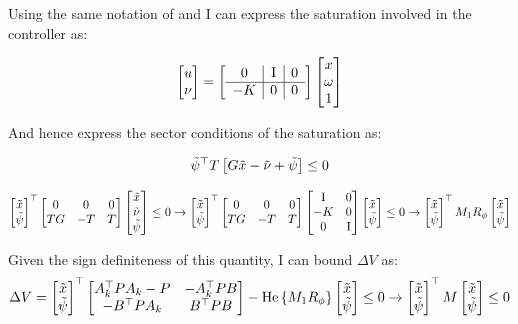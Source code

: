 \documentclass{article}
\begin{document}
Using the same notation of \cite{css-extended} and \cite{css-paper} I can express the saturation involved in the controller as:

\begin{equation}
    \left[\begin{matrix}u\\ \nu\end{matrix}\right] = \left[\begin{matrix}\begin{array}{c|c|c} 
        0 & \operatorname{I} & 0 \\
        \hline
        -K & 0 & 0
    \end{array}\end{matrix}\right]  \left[\begin{matrix}x \\ \omega \\ 1\end{matrix}\right]
\end{equation}

And hence express the sector conditions of the saturation as:

\begin{equation*}
  \tilde{\psi}^\top T \left[ G \tilde{x} - \tilde{\nu} + \tilde{\psi} \right] \leq 0
\end{equation*}

\begin{equation}\label{sector}
  \left[\begin{matrix}\tilde{x} \\ \tilde{\psi}\end{matrix}\right]^\top \left[\begin{matrix}
    0 & 0 & 0 \\
    TG & -T & T
  \end{matrix}\right] \left[\begin{matrix}\tilde{x} \\ \tilde{\nu} \\ \tilde{\psi}\end{matrix}\right] \leq 0 \to
  \left[\begin{matrix}\tilde{x} \\ \tilde{\psi}\end{matrix}\right]^\top \left[\begin{matrix}
    0 & 0 & 0 \\
    TG & -T & T
  \end{matrix}\right] \left[\begin{matrix}\operatorname{I} & 0\\
  -K & 0\\
  0 & \operatorname{I}\end{matrix}\right] \left[\begin{matrix}\tilde{x} \\ \tilde{\psi}\end{matrix}\right] \leq 0 \to \left[\begin{matrix}\tilde{x} \\ \tilde{\psi}\end{matrix}\right]^\top M_{1} R_{\phi} \left[\begin{matrix}\tilde{x} \\ \tilde{\psi}\end{matrix}\right]
\end{equation}

Given the sign definiteness of this quantity, I can bound $\Delta V$ as: 
\begin{equation}\label{matricione}
  \Delta V = \left[\begin{matrix}\tilde{x} \\ \tilde{\psi}\end{matrix}\right]^\top \left[\begin{matrix}
    A_k^\top P A_k - P & -A_k^\top P B \\
    -B^\top P A_k & B^\top P B
  \end{matrix}\right] -\text{He}\left\{ M_1 R_{\phi} \right\} \left[\begin{matrix}\tilde{x}\\ \tilde{\psi}\end{matrix}\right] \leq 0 \to \left[\begin{matrix}\tilde{x} \\ \tilde{\psi}\end{matrix}\right]^\top M \left[\begin{matrix}\tilde{x} \\ \tilde{\psi}\end{matrix}\right] \leq 0
\end{equation}  
\end{document}
